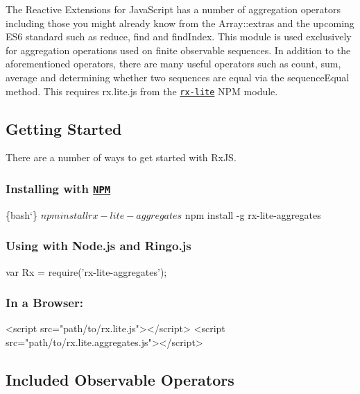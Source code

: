 The Reactive Extensions for Java\+Script has a number of aggregation operators including those you might already know from the Array\+::extras and the upcoming E\+S6 standard such as {\ttfamily reduce}, {\ttfamily find} and {\ttfamily find\+Index}. This module is used exclusively for aggregation operations used on finite observable sequences. In addition to the aforementioned operators, there are many useful operators such as {\ttfamily count}, {\ttfamily sum}, {\ttfamily average} and determining whether two sequences are equal via the {\ttfamily sequence\+Equal} method. This requires {\ttfamily rx.\+lite.\+js} from the \href{https://www.npmjs.com/package/rx-lite}{\tt {\ttfamily rx-\/lite}} N\+PM module.

\subsection*{Getting Started}

There are a number of ways to get started with Rx\+JS.

\subsubsection*{Installing with \href{https://npmjs.org/}{\tt N\+PM}}


\begin{DoxyCode}
\{bash`\}
$ npm install rx-lite-aggregates
$ npm install -g rx-lite-aggregates
\end{DoxyCode}


\subsubsection*{Using with Node.\+js and Ringo.\+js}


\begin{DoxyCode}
var Rx = require('rx-lite-aggregates');
\end{DoxyCode}


\subsubsection*{In a Browser\+:}


\begin{DoxyCode}
<script src="path/to/rx.lite.js"></script>
<script src="path/to/rx.lite.aggregates.js"></script>
\end{DoxyCode}


\subsection*{Included Observable Operators}

